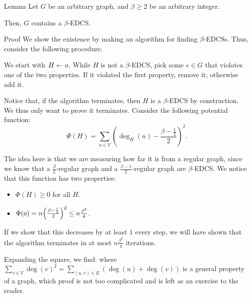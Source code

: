 \documentclass[a4paper]{article}
\begin{document}
\begin{parag}{Lemma}
    Let $G$ be an arbitrary graph, and $\beta \geq 2$ be an arbitrary integer.

    Then, $G$ contains a $\beta$-EDCS.

    \begin{subparag}{Proof}
        We show the existence by making an algorithm for finding $\beta$-EDCSs. Thus, consider the following procedure.

        We start with $H \leftarrow \o$. While $H$ is not a $\beta$-EDCS, pick some $e \in G$ that violates one of the two properties. If it violated the first property, remove it; otherwise add it.

        Notice that, if the algorithm terminates, then $H$ is a $\beta$-EDCS by construction. We thus only want to prove it terminates. Consider the following potential function: 
        \[\Phi\left(H\right) = \sum_{u \in V} \left(\deg_H\left(u\right) - \frac{\beta - \frac{1}{2}}{2}\right)^2.\]

        The idea here is that we are measuring how far it is from a regular graph, since we know that a $\frac{\beta}{2}$-regular graph and a $\frac{\beta - 1}{2}$-regular graph are $\beta$-EDCS. We notice that this function has two properties:
        \begin{itemize}
            \item $\Phi\left(H\right)\geq 0$ for all $H$.
            \item $\Phi\left(\o\right) = n \left(\frac{\beta - \frac{1}{2}}{2}\right)^2 \leq n \frac{\beta^2}{4}$.
        \end{itemize}
        
        If we show that this decreases by at least $1$ every step, we will have shown that the algorithm terminates in at most $n \frac{\beta^2}{4}$ iterations.

        Expanding the square, we find:
        where $\sum_{v \in V} \deg\left(v\right)^2 = \sum_{\left(u, v\right) \in E} \left(\deg\left(u\right) + \deg\left(v\right)\right)$ is a general property of a graph, which proof is not too complicated and is left as an exercise to the reader.


\end{subparag}
\end{parag}
\end{document}
